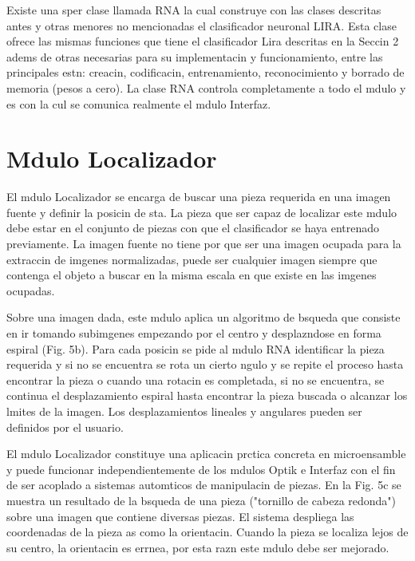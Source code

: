 \begin{figure}[h]
\begin{center}
\end{center}
\end{figure}

Existe una sper clase llamada RNA la cual construye con las clases
descritas antes y otras menores no mencionadas el clasificador
neuronal LIRA. Esta clase ofrece las mismas funciones que tiene el
clasificador Lira descritas en la Seccin 2 adems de otras necesarias
para su implementacin y funcionamiento, entre las principales estn:
creacin, codificacin, entrenamiento, reconocimiento y borrado de
memoria (pesos a cero). La clase RNA controla completamente a todo el
mdulo y es con la cul se comunica realmente el mdulo Interfaz. 

\section{Mdulo Localizador}
El mdulo Localizador se encarga de buscar una pieza requerida en una
imagen fuente y definir la posicin de sta. La pieza que ser capaz
de localizar este mdulo debe estar en el conjunto de piezas con que
el clasificador se haya entrenado previamente. La imagen fuente no
tiene por que ser una imagen ocupada para la extraccin de imgenes
normalizadas, puede ser cualquier imagen siempre que contenga el
objeto a buscar en la misma escala en que existe en las imgenes
ocupadas.

Sobre una imagen dada, este mdulo aplica un algoritmo de bsqueda que
consiste en ir tomando subimgenes empezando por el centro y
desplazndose en forma espiral (Fig. 5b). Para cada posicin se pide
al mdulo RNA identificar la pieza requerida y si no se encuentra se
rota un cierto ngulo y se repite el proceso hasta encontrar la pieza
o cuando una rotacin es completada, si no se encuentra, se continua
el desplazamiento espiral hasta encontrar la pieza buscada o alcanzar
los lmites de la imagen. Los desplazamientos lineales y angulares
pueden ser definidos por el usuario.

El mdulo Localizador constituye una aplicacin prctica concreta en
microensamble y puede funcionar independientemente de los mdulos
Optik e Interfaz con el fin de ser acoplado a sistemas automticos de
manipulacin de piezas. En la Fig. 5c se muestra un resultado de la
bsqueda de una pieza ("tornillo de cabeza redonda") sobre una imagen
que contiene diversas piezas. El sistema despliega las coordenadas de
la pieza as como la orientacin. Cuando la pieza se localiza lejos de
su centro, la orientacin es errnea, por esta razn este mdulo debe ser mejorado.

